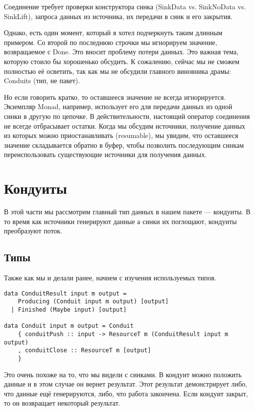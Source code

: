 Соединение требует проверки конструктора синка (SinkData vs. 
SinkNoData vs. SinkLift), запроса данных из источника, их передачи в синк и его закрытия.

Однако, есть один момент, который я хотел подчеркнуть таким длинным примером. Со второй
по последнюю строчки мы игнорируем значение, возвращаемое с Done. Это вносит проблему
потери данных. Это важная тема, которую стоило бы хорошенько обсудить. К сожалению,
сейчас мы не сможем полностью её осветить, так как мы не обсудили главного виновника
драмы: Conduits (тип, не пакет). %

Но если говорить кратко, то оставшееся значение не всегда игнорируется. Экземпляр Monad,
например, использует его для передачи данных из одной синки в другую по цепочке.
В действительности, настоящий оператор соединения не всегде отбрасывает остатки. Когда мы
обсудим источники, получение данных из которых можно приостанавливать (resumable), мы
увидим, что оставшееся значение складывается обратно в буфер, чтобы позволить последующим
синкам переиспользовать существующие источники для получения данных.

\section{Кондуиты}
В этой части мы рассмотрим главный тип данных в нашем пакете --- кондуиты. В то время как
источники генерируют данные а синки их поглощают, кондуиты преобразуют поток.

\subsection{Типы}
Также как мы и делали ранее, начнем с изучения используемых типов.
\begin{lstlisting}
data ConduitResult input m output =
    Producing (Conduit input m output) [output]
  | Finished (Maybe input) [output]

data Conduit input m output = Conduit
    { conduitPush :: input -> ResourceT m (ConduitResult input m output)
    , conduitClose :: ResourceT m [output]
    }
\end{lstlisting}
Это очень похоже на то, что мы видели с синками. В кондуит можно положить данные и в этом
случае он вернет результат. Этот результат демонстрирует либо, что данные ещё
генерируются, либо, что работа закончена. Если кондуит закрыт, то он возвращает некоторый
результат.

